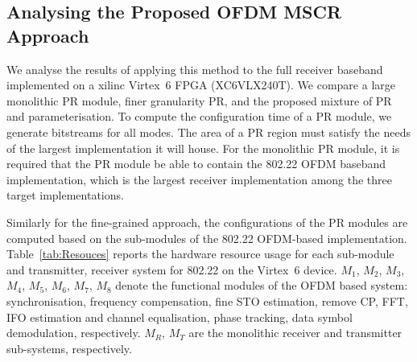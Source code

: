\subsection{Analysing the Proposed OFDM MSCR Approach}
We analyse the results of applying this method to the full receiver baseband  implemented on a xilinc Virtex~6 FPGA (XC6VLX240T).
We compare a large monolithic PR module, finer granularity PR, and the proposed mixture of PR and parameterisation.
To compute the configuration time of a PR module, we generate bitstreams for all modes.
The area of a PR region must satisfy the needs of the largest implementation it will house.
For the monolithic PR module, it is required that the PR module be able to contain the 802.22 OFDM baseband implementation, which is the largest receiver implementation among the three target implementations.

Similarly for the fine-grained approach, the configurations of the PR modules are computed based on the sub-modules of the 802.22 OFDM-based  implementation.
Table~\ref{tab:Resouces} reports the hardware resource usage for each sub-module and transmitter, receiver system for 802.22 on the Virtex~6 device. $M_1$, $M_2$, $M_3$, $M_4$, $M_5$, $M_6$, $M_7$, $M_8$ denote the functional modules of the OFDM based system: synchronisation, frequency compensation, fine STO estimation, remove CP, FFT, IFO estimation and channel equalisation, phase tracking, data symbol demodulation, respectively. $M_R$, $M_T$ are the monolithic receiver and transmitter sub-systems, respectively.

